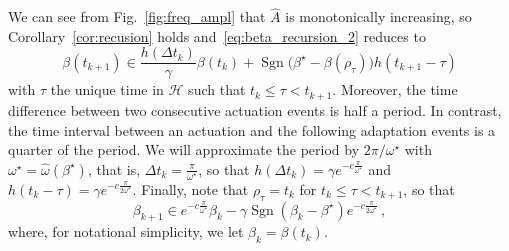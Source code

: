 \documentclass{article}
\newcommand{\HH}{\mathcal{H}}
\newcommand{\rn}{\mathrm{n}}
\DeclareMathOperator{\sgn}{Sgn}
\theoremstyle{definition}
\theoremstyle{remark}
\begin{document}
We can see from Fig.~\ref{fig:freq_ampl} that $\hat{A}$ is monotonically increasing, so Corollary~\ref{cor:recusion} holds and~\eqref{eq:beta_recursion_2} reduces to
\begin{equation} \label{eq:beta_recursion_3}
    \beta\left(t_{k+1}\right) \in \frac{h\left(\Delta t_k\right)}{\gamma}\beta\left(t_{k}\right) +
        \sgn\big(\beta^\star-\beta\left(\rho_\tau\right)\big)h\left(t_{k+1}-\tau\right)
\end{equation}
with $\tau$ the unique time in $\HH$ such that $t_{k} \le \tau < t_{k+1}$. Moreover, the time difference between two consecutive actuation events is half a period. In contrast, the time interval between an actuation and the following adaptation events is a quarter of the period. We will approximate the period by $2\pi/\omega^\star$ with $\omega^\star = \hat{\omega}(\beta^\star)$, that is, $\Delta t_k = \frac{\pi}{\omega^\star}$, so that $h\left(\Delta t_k\right) = \gamma e^{-c\frac{\pi}{\omega^\star}}$ and $h\left(t_k-\tau\right) = \gamma e^{-c\frac{\pi}{2\omega^\star}}$.
Finally, note that $\rho_\tau = t_k$ for $t_{k} \le \tau < t_{k+1}$, so that
\begin{equation} \label{eq:beta_first}
    \beta_{k+1} \in e^{-c\frac{\pi}{\omega^\star}} \beta_k - \gamma \sgn\left(\beta_k-\beta^\star\right)e^{-c\frac{\pi}{2\omega^\star}}\,,
\end{equation}
where, for notational simplicity, we let $\beta_k = \beta(t_k)$.

    
\end{document}
